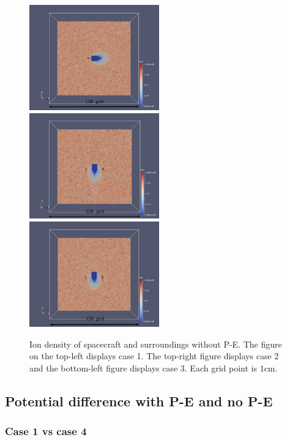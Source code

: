 	    \begin{figure}
	        \includegraphics[width = 0.5\textwidth]{images/case1}
	        \includegraphics[width = 0.5\textwidth]{images/case2}
			\includegraphics[width = 0.5\textwidth]{images/case3}
	        \caption{Ion density of spacecraft and surroundings without P-E. The figure on the top-left displays case 1. The top-right figure displays case 2 and the bottom-left figure displays case 3. Each
			grid point is \(1\)cm.}
			\label{fig:wake}
	    \end{figure}


\subsection{Potential difference with P-E and no P-E}
\label{sec:pot_diff}

\subsubsection{Case 1 vs case 4}

